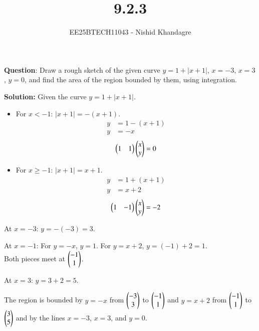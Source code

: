 \documentclass[journal]{IEEEtran}
\title{9.2.3}
\author{EE25BTECH11043 - Nishid Khandagre}
\begin{document}
\maketitle

\renewcommand{\thefigure}{\theenumi}
\renewcommand{\thetable}{\theenumi}


\textbf{Question}:
Draw a rough sketch of the given curve $y = 1 + |x + 1|$, $x = -3$, $x = 3$, $y = 0$, and
find the area of the region bounded by them, using integration.

\textbf{Solution: }
Given the curve $y = 1 + |x + 1|$.
\begin{itemize}
    \item For $x < -1$: $|x+1| = -(x+1)$.
    \begin{align}
        y &= 1 - (x+1) \\
        y &= -x
        \end{align}
        \begin{align}
        \begin{pmatrix}1&1\end{pmatrix}\begin{pmatrix}x\\y\end{pmatrix}=0
    \end{align}
    \item For $x \ge -1$: $|x+1| = x+1$.
    \begin{align}
        y &= 1 + (x+1) \\
        y &= x+2
        \end{align}
        \begin{align}
        \begin{pmatrix}1&-1\end{pmatrix}\begin{pmatrix}x\\y\end{pmatrix}=-2
    \end{align}
\end{itemize}

At $x=-3$: $y = -(-3) = 3$.

At $x=-1$: For $y=-x$, $y=1$. For $y=x+2$, $y=(-1)+2=1$.\\Both pieces meet at $\begin{pmatrix}-1\\1\end{pmatrix}$.

At $x=3$: $y = 3+2 = 5$.


The region is bounded by $y = -x$ from $\begin{pmatrix}-3\\3\end{pmatrix}$ to $\begin{pmatrix}-1\\1\end{pmatrix}$ and $y = x+2$ from $\begin{pmatrix}-1\\1\end{pmatrix}$ to $\begin{pmatrix}3\\5\end{pmatrix}$ and by the lines $x=-3$, $x=3$, and $y=0$.
\end{document}
